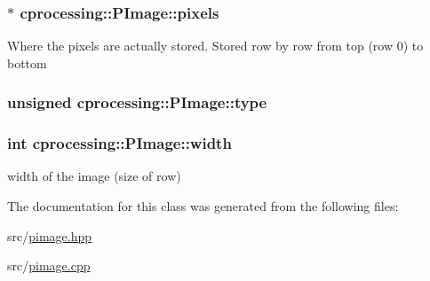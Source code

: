 \hypertarget{classcprocessing_1_1PImage_a6c411ebe0b1bb92e0e17a3e5ffaf7bf0}{
\subsubsection[{pixels}]{$\ast$ {\bf cprocessing\-::\-P\-Image\-::pixels}}}\label{classcprocessing_1_1PImage_a6c411ebe0b1bb92e0e17a3e5ffaf7bf0}
\-Where the pixels are actually stored. \-Stored row by row from top (row 0) to bottom \hypertarget{classcprocessing_1_1PImage_a465d1a7c776bc7735cc5bdb4dca20586}{
\subsubsection[{type}]{\setlength{\rightskip}{0pt plus 5cm}unsigned {\bf cprocessing\-::\-P\-Image\-::type}}}\label{classcprocessing_1_1PImage_a465d1a7c776bc7735cc5bdb4dca20586}
\hypertarget{classcprocessing_1_1PImage_a784b1e16d4ccfa218e8cf430ea6ca5ea}{
\subsubsection[{width}]{\setlength{\rightskip}{0pt plus 5cm}int {\bf cprocessing\-::\-P\-Image\-::width}}}\label{classcprocessing_1_1PImage_a784b1e16d4ccfa218e8cf430ea6ca5ea}


width of the image (size of row) 



\-The documentation for this class was generated from the following files\-:\begin{DoxyCompactItemize}
\item 
src/\hyperlink{pimage_8hpp}{pimage.\-hpp}\item 
src/\hyperlink{pimage_8cpp}{pimage.\-cpp}\end{DoxyCompactItemize}
